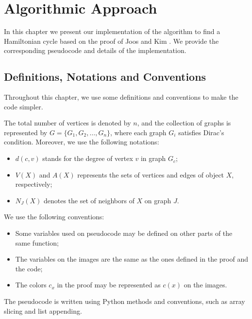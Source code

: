 
\chapter{Algorithmic Approach}
\label{chap:algorithmic}

In this chapter we present our implementation of the algorithm to find a Hamiltonian cycle
based on the proof of Joos and Kim \cite{Joos_2020}. We provide the corresponding pseudocode 
and details of the implementation.

\section{Definitions, Notations and Conventions}


Throughout this chapter, we use some definitions and conventions to make the code simpler.

The total number of vertices is denoted by $n$, and the collection of 
graphs is represented by $G = \{G_1, G_2, \dots, G_n\}$, where each graph $G_i$ 
satisfies Dirac's condition. Moreover, we use the following notations:

\begin{itemize}
    \item $d(c, v)$ stands for the degree of vertex $v$ in graph $G_c$;
    \item $V(X)$ and $A(X)$ represents the sets of vertices and edges of object $X$, respectively;
    \item $N_J(X)$ denotes the set of neighbors of $X$ on graph $J$.
\end{itemize}

We use the following conventions:

\begin{itemize}
    \item Some variables used on pseudocode may be defined on other parts of the same function;
    \item The variables on the images are the same as the ones defined in the proof and the code;
    \item The colors $c_x$ in the proof may be represented as $c(x)$ on the images.
\end{itemize}

The pseudocode is written using Python methods and conventions, such as array slicing and 
list appending.

